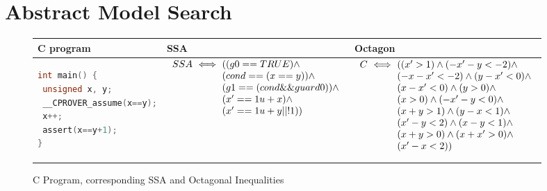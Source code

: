 \section{Abstract Model Search}
%
\begin{figure}[t]
\scriptsize
\begin{tabular}{l|l|l}
\hline
C program & SSA & Octagon \\
\hline
\begin{lstlisting}[mathescape=true,language=C]
int main() {
 unsigned x, y;
 __CPROVER_assume(x==y);
 x++;
 assert(x==y+1);
}
\end{lstlisting}
&
\begin{minipage}{4.40cm}
$\begin{array}{l@{\,\,}c@{\,\,}l}
SSA &\iff& ((g0 == TRUE) \land \\
    &    & (cond == (x == y)) \land \\
    &    & (g1 == (cond \&\& guard0)) \land \\
    &    & (x' == 1u + x) \land \\
    &    & (x' == 1u + y || !1))
\end{array}$
\end{minipage}
&
\begin{minipage}{3.75cm}
$\begin{array}{l@{\,\,}c@{\,\,}l}
C &\iff& ((x' > 1) \land (-x'-y < -2) \land \\
  &    & (-x-x' < -2) \land (y-x' < 0) \land \\                                                                
  &    & (x-x' < 0) \land (y > 0) \land \\
  &    & (x > 0) \land (-x'-y < 0) \land \\
  &    & (x+y > 1) \land (y-x < 1) \land \\
  &    & (x'-y < 2) \land (x-y < 1) \land \\
  &    & (x+y > 0) \land (x+x' > 0) \land \\
  &    & (x'-x < 2))
\end{array}$
\end{minipage}
\\
\hline
\end{tabular}
\caption{C Program, corresponding SSA and Octagonal Inequalities}
\label{ssa}
\end{figure}
%
%    
